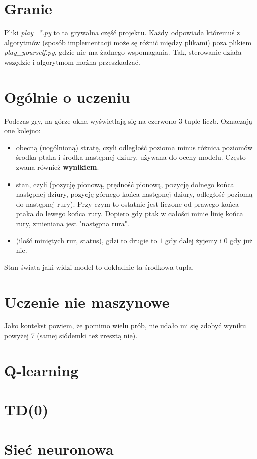 \documentclass[12pt, A4]{article}
\begin{document}
\section{Granie}
Pliki \textit{play\_*.py} to ta grywalna część projektu. Każdy odpowiada któremuś z algorytmów (sposób implementacji może sę różnić między plikami) poza plikiem \textit{play\_yourself.py}, gdzie nie ma żadnego wspomagania. Tak, sterowanie działa wszędzie i algorytmom można przeszkadzać.


\section{Ogólnie o uczeniu}
Podczas gry, na górze okna wyświetlają się na czerwono 3 tuple liczb. Oznaczają one kolejno:
\begin{itemize}
	\item obecną (uogólnioną) stratę, czyli odległość pozioma minus różnica poziomów środka ptaka i środka następnej dziury, używana do oceny modelu. Często zwana również \textbf{wynikiem}.
	\item stan, czyli (pozycję pionową, prędność pionową, pozycję dolnego końca następnej dziury, pozycję górnego końca następnej dziury, odległość poziomą do następnej rury). Przy czym to ostatnie jest liczone od prawego końca ptaka do lewego końca rury. Dopiero gdy ptak w całości minie linię końca rury, zmieniana jest "następna rura".
	\item (ilość miniętych rur, status), gdzi to drugie to $1$ gdy dalej żyjemy i $0$ gdy już nie.
\end{itemize}
Stan świata jaki widzi model to dokładnie ta środkowa tupla.


\section{Uczenie nie maszynowe}
Jako kontekst powiem, że pomimo wielu prób, nie udało mi się zdobyć wyniku powyżej 7 (samej siódemki też zresztą nie).


\section{Q-learning}


\section{TD(0)}


\section{Sieć neuronowa}
\end{document}
